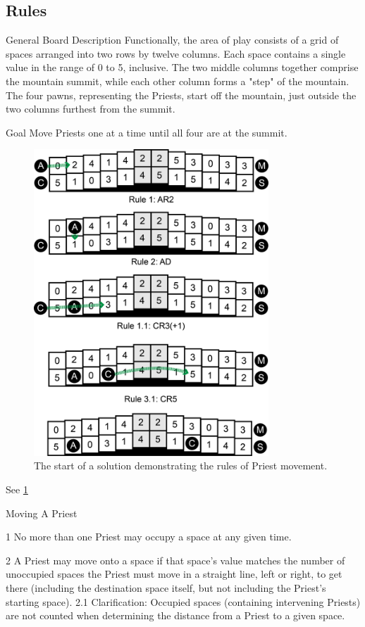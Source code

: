 \documentclass[10pt,journal,compsoc]{IEEEtran}
\begin{document}
\subsection{Rules}
 \noindent
General Board Description
Functionally, the area of play consists of a grid of spaces arranged into two rows by twelve columns. Each space contains a single value in the range of 0 to 5, inclusive. The two middle columns together comprise the mountain summit, while each other column forms a "step" of the mountain. The four pawns, representing the Priests, start off the mountain, just outside the two columns furthest from the summit.

Goal
Move Priests one at a time until all four are at the summit.  

\begin{figure}[t]
\centering
\includegraphics[width=8.8cm]{graphics/fujisan-priestrules.png}
\caption{The start of a solution demonstrating the rules of Priest movement.}
\label{fig:priestrules}
\end{figure}

See \ref{fig:priestrules}

Moving A Priest

1   No more than one Priest may occupy a space at any given time.

2   A Priest may move onto a space if that space's value matches the number of unoccupied spaces the Priest must move in a straight line, left or right, to get there (including the destination space itself, but not including the Priest's starting space). %
2.1 Clarification: Occupied spaces (containing intervening Priests) are not counted when determining the distance from a Priest to a given space. %
\end{document}
